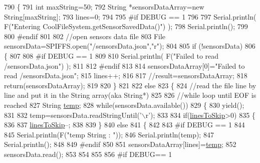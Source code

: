 \begin{DoxyCode}
790 \{
791     \textcolor{keywordtype}{int} maxString=50;
792     String *sensorsDataArray=\textcolor{keyword}{new} String[maxString];
793     lines=0;
794 
795 \textcolor{preprocessor}{#if DEBUG == 1 }
796 
797     Serial.println( F(\textcolor{stringliteral}{"Entering CoolFileSystem.getSensorSavedData()"}) );
798     Serial.println();
799 
800 \textcolor{preprocessor}{#endif}
801 
802     \textcolor{comment}{//open sensors data file}
803     File sensorsData=SPIFFS.open(\textcolor{stringliteral}{"/sensorsData.json"},\textcolor{stringliteral}{"r"});
804     
805     \textcolor{keywordflow}{if} (!sensorsData)
806     \{
807 
808 \textcolor{preprocessor}{    #if DEBUG == 1 }
809 
810         Serial.println( F(\textcolor{stringliteral}{"Failed to read /sensorsData.json"}) );
811 
812 \textcolor{preprocessor}{    #endif}
813          
814         sensorsDataArray[0]=\textcolor{stringliteral}{"Failed to read /sensorsData.json"};
815         lines++;
816 
817         \textcolor{comment}{//result=sensorsDataArray;}
818         \textcolor{keywordflow}{return}(sensorsDataArray);
819 
820     \}
821 
822     \textcolor{keywordflow}{else}
823     \{
824         \textcolor{comment}{//read the file line by line and put it in the String array(aka String*)        }
825 
826         \textcolor{comment}{//while loop until EOF is reached}
827         String \hyperlink{_irene3000_8h_a5905d48604152cf57aa6bfa087b49173}{temp};
828         \textcolor{keywordflow}{while}(sensorsData.available())
829         \{
830             yield();
831             
832             temp=sensorsData.readStringUntil(\textcolor{charliteral}{'\(\backslash\)r'});
833 
834             \textcolor{keywordflow}{if}(\hyperlink{class_cool_file_system_a84fdb6057e534b395512463daa28ea3c}{linesToSkip}>0)
835             \{
836 
837                 \hyperlink{class_cool_file_system_a84fdb6057e534b395512463daa28ea3c}{linesToSkip}--;
838         
839             \}
840             \textcolor{keywordflow}{else}
841             \{
842 
843 \textcolor{preprocessor}{            #if DEBUG == 1}
844 
845                 Serial.println(F(\textcolor{stringliteral}{"temp String : "}));
846                 Serial.println(temp);
847                 Serial.println();
848             
849 \textcolor{preprocessor}{            #endif}
850             
851                 sensorsDataArray[lines]=\hyperlink{_irene3000_8h_a5905d48604152cf57aa6bfa087b49173}{temp};
852                 sensorsData.read();
853             
854             
855         
856 \textcolor{preprocessor}{            #if DEBUG== 1}

\end{DoxyCode}
